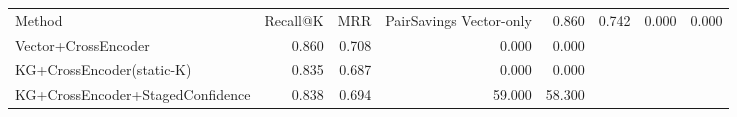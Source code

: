 \begin{tabular}{lrrrr}
\toprule
Method & Recall@K & MRR & PairSavings%
\midrule
Vector-only & 0.860 & 0.742 & 0.000 & 0.000 \\
Vector+CrossEncoder & 0.860 & 0.708 & 0.000 & 0.000 \\
KG+CrossEncoder(static-K) & 0.835 & 0.687 & 0.000 & 0.000 \\
KG+CrossEncoder+StagedConfidence & 0.838 & 0.694 & 59.000 & 58.300 \\
\bottomrule
\end{tabular}
